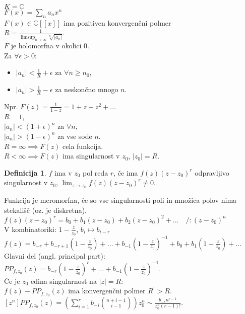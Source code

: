 \documentclass[a4paper, 12pt]{book}
\theoremstyle{definition}
\newtheorem{defn}[counter]{Definicija}
\theoremstyle{remark}
\newcommand{\C}{\mathbb{C}}
\begin{document}
$K = \C$ \\
$F(x) = \sum_n a_n x^n$ \\
$F(x) \in \C[[x]]$ ima pozitiven konvergenčni polmer \\
$R = \frac{1}{\limsup_{n \to \infty} \sqrt[n]{|a_n|}}$. \\
$F$ je holomorfna v okolici $0$. \\
Za $\forall \epsilon > 0$:
\begin{itemize}
  \item $|a_n| < \frac{1}{R} + \epsilon$ za $\forall n \geq n_0$,
  \item $|a_n| > \frac{1}{R} - \epsilon$ za neskončno mnogo $n$.
\end{itemize}
Npr. $F(z) = \frac{1}{1-z} = 1 + z + z^2 + \dots$ \\
$R = 1$, \\
$|a_n| < (1 + \epsilon)^n$ za $\forall n$, \\
$|a_n| > (1 - \epsilon)^n$ za vse sode $n$. \\
$R = \infty \implies F(z)$ cela funkcija. \\
$R < \infty \implies F(z)$ ima singularnost v $z_0$, $|z_0| = R$.
\begin{defn}
  $f$ ima v $z_0$ pol reda $r$, če ima $f(z) (z-z_0)^r$ odpravljivo singularnost v $z_0$,
  $\lim_{z \to z_0} f(z) (z-z_0)^r \neq 0$.
\end{defn}
Funkcija je meromorfna, če so vse singularnosti poli in množica polov nima stekališč (oz. je diskretna). \\
$f(z) (z-z_0)^r = b_0 + b_1(z-z_0) + b_2(z-z_0)^2 + \dots \quad /: (z-z_0)^n$ \\
V kombinatoriki: $1 - \frac{z}{z_0}$, $b_i \mapsto b_{i-r}$ \\
$f(z) = b_{-r} + b_{-r+1} \left(1-\frac{z}{z_0}\right) + \dots +
b_{-1} \left(1-\frac{z}{z_0}\right)^{-1} + b_0 + b_1 \left(1-\frac{z}{z_0}\right) + \dots$ \\
Glavni del (angl. principal part): \\
$PP_{f,z_0}(z) = b_{-r} \left(1-\frac{z}{z_0}\right)^r + \dots + b_{-1} \left(1-\frac{z}{z_0}\right)^{-1}$. \\
Če je $z_0$ edina singularnost na $|z| = R$: \\
$f(z) - PP_{f,z_0}(z)$ ima konvergenčni polmer $R^{'} > R$. \\
$[z^n] PP_{f,z_0}(z) = \left(\sum_{i=1}^{r} b_{-i} \binom{n+i-1}{i-1}\right) z_0^n \sim
\frac{b_{-r} n^{r-1}}{z_0^n (r-1)!}$. \\
\end{document}

